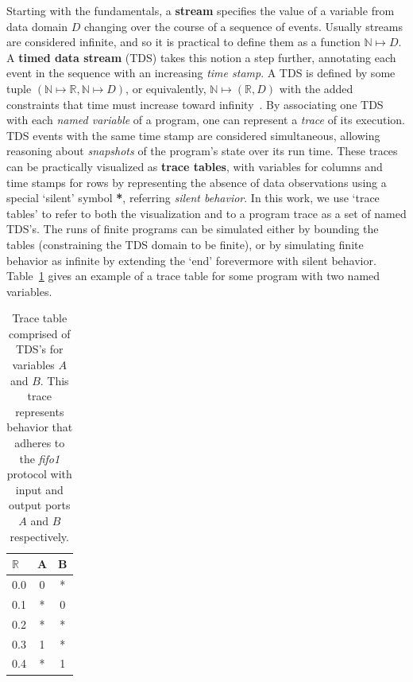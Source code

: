 Starting with the fundamentals, a \textbf{stream} specifies the value of a variable from data domain $D$ changing over the course of a sequence of events. Usually streams are considered infinite, and so it is practical to define them as a function $\mathbb{N}\mapsto{}D$. A \textbf{timed data stream} (TDS) takes this notion a step further, annotating each event in the sequence with an increasing \textit{time stamp}. A TDS is defined by some tuple $(\mathbb{N}\mapsto{}\mathbb{R}, \mathbb{N}\mapsto{}D)$, or equivalently, $\mathbb{N}\mapsto{}(\mathbb{R}, D)$ with the added constraints that time must increase toward infinity~\cite{arbab2004modeling}. By associating one TDS with each \textit{named variable} of a program, one can represent a \textit{trace} of its execution. TDS events with the same time stamp are considered simultaneous, allowing reasoning about \textit{snapshots} of the program's state over its run time. These traces can be practically visualized as \textbf{trace tables}, with variables for columns and time stamps for rows by representing the absence of data observations using a special `silent' symbol \textbf{*}, referring \textit{silent behavior}. In this work, we use `trace tables' to refer to both the visualization and to a program trace as a set of named TDS's. The runs of finite programs can be simulated either by bounding the tables (constraining the TDS domain to be finite), or by simulating finite behavior as infinite by extending the `end' forevermore with silent behavior. Table~\ref{tab:fifo1_eg} gives an example of a trace table for some program with two named variables.


\begin{table}[]
	\centering
	\begin{tabular}{l|cc}
		$\mathbb{R}$  & A & B \\ \hline
		0.0 & 0 & * \\
		0.1 & * & 0 \\
		0.2 & * & * \\
		0.3 & 1 & * \\
		0.4 & * & 1
	\end{tabular}
	\caption[Trace table of a system adherent to fifo1.]{Trace table comprised of TDS's for variables $A$ and $B$. This trace represents behavior that adheres to the \textit{fifo1} protocol with input and output ports $A$ and $B$ respectively.}
	\label{tab:fifo1_eg}
\end{table}


